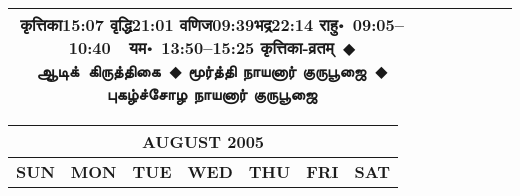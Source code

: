 \documentclass[a3paper,12pt,landscape]{article}
\newcommand{\eventsep}{~$\Diamondblack$ }
\newcommand{\To}{\hspace{1pt}\raisebox{0pt}{\tiny\RIGHTarrow}\hspace{1pt}}
\newcommand{\tamil}[1]{%
{\fontspec[Scale=0.9,FakeStretch=0.9]{Noto Sans Tamil} \footnotesize #1}}
\newcommand{\rahuyama}[2]{%
{राहु॰~\textsf{#1}~~यम॰~\textsf{#2}}
}
\begin{document}
\begin{center}
\begin{tabular}{|c|c|c|c|c|c|c|}
{{\mbox{कृत्तिका\To{}\textsf{15:07\hspace{2ex}}}}%
{\mbox{वृद्धि\To{}\textsf{21:01\hspace{2ex}}}}%
{\mbox{वणिज\To{}\textsf{09:39\hspace{2ex}}}\mbox{भद्र\To{}\textsf{22:14\hspace{2ex}}}}}%
{\rahuyama{09:05--10:40}{13:50--15:25}}%
{कृत्तिका-व्रतम्\eventsep \tamil{ஆடிக்~கிருத்திகை}\eventsep \tamil{மூர்த்தி நாயனார் குருபூஜை}\eventsep \tamil{புகழ்ச்சோழ நாயனார் குருபூஜை}}
\\ \hline %
\end{tabular}



\begin{tabular}{|c|c|c|c|c|c|c|}
\multicolumn{7}{c}{\Large \bfseries \sffamily AUGUST 2005}\\[3mm]
\hline
\textbf{\textsf{SUN}} & \textbf{\textsf{MON}} & \textbf{\textsf{TUE}} & \textbf{\textsf{WED}} & \textbf{\textsf{THU}} & \textbf{\textsf{FRI}} & \textbf{\textsf{SAT}} \\ \hline


\end{tabular}
\end{center}
\end{document}
